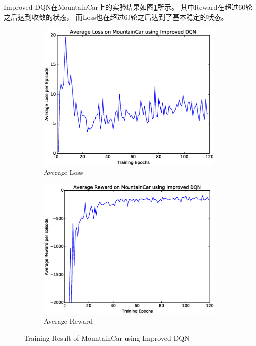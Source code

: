 \documentclass[a4paper,UTF8]{article}
\theoremstyle{definition}
\begin{document}
Improved DQN在MountainCar上的实验结果如图\ref{fig:car-idqn}所示。
其中Reward在超过60轮之后达到收敛的状态，
而Loss也在超过60轮之后达到了基本稳定的状态。

\begin{figure}[H]
	\centering
	\begin{subfigure}[t]{0.5\textwidth}
		\centering
		\includegraphics[scale=0.35]{figures/car-idqn-loss}
		\caption{Average Loss}
	\end{subfigure}%
	\begin{subfigure}[t]{0.5\textwidth}
		\centering
		\includegraphics[scale=0.35]{figures/car-idqn-reward}
		\caption{Average Reward}
	\end{subfigure}
	\caption{Training Result of MountainCar using Improved DQN}\label{fig:car-idqn}
\end{figure}
\end{document}
